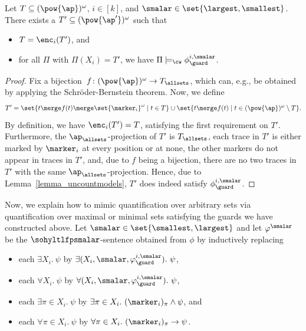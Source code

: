 \begin{lem}
\label{lemma_encodingrichness}
Let $T \subseteq (\pow{\ap})^\omega$, $i \in [k]$, and $\smalar \in \set{\largest,\smallest}$.
There exists a $T' \subseteq (\pow{\ap'})^\omega$ such that
\begin{itemize}
    \item $T = \enc_i(T')$, and 
    \item for all $\Pi$ with $\Pi(X_i) = T'$, we have $\Pi \models_\cw \phi_\guard^{i,\smalar}$.
\end{itemize}
\end{lem}

\begin{proof}
Fix a bijection~$f \colon (\pow{\ap})^\omega \rightarrow T_\allsets$, which can, e.g., be obtained by applying the Schröder-Bernstein theorem.
Now, we define 
\[T' = \set{t\merge f(t) \merge\set{\marker_{i}}^\omega \mid t \in T} \cup \set{t\merge f(t) \mid t \in (\pow{\ap})^\omega \setminus T}. \]
By definition, we have $\enc_i(T') = T$, satisfying the first requirement on $T'$.
Furthermore, the $\ap_\allsets$-projection of $T'$ is $T_\allsets$, each trace in $T'$ is either marked by $\marker_{i}$ at every position or at none, the other markers do not appear in traces in $T'$, and, due to $f$ being a bijection, there are no two traces in $T'$ with the same $\ap_\allsets$-projection.
Hence, due to Lemma~\ref{lemma_uncountmodels}, $T'$ does indeed satisfy $\phi_\guard^{i,\smalar}$.
\end{proof}

Now, we explain how to mimic quantification over arbitrary sets via quantification over maximal or minimal sets satisfying the guards we have constructed above.
Let $\smalar \in \set{\smallest, \largest}$ and let $\varphi^{\smalar}$ be the $\sohyltlfpsmalar$-sentence obtained from $\phi$ by inductively replacing 
\begin{itemize}
    \item each $\exists X_i.\ \psi$ by $\exists (X_i, \smalar, \varphi_\guard^{i,\smalar}).\ \psi$, 
    \item each $\forall X_i.\ \psi$ by $\forall (X_i, \smalar, \varphi_\guard^{i,\smalar}).\ \psi$, 
    \item each $\exists \pi \in X_i.\ \psi$ by $\exists \pi \in X_i.\ (\marker_{i})_{\pi} \wedge \psi$, and 
    \item each $\forall \pi \in X_i.\ \psi$ by $\forall \pi \in X_i.\ (\marker_{i})_{\pi} \rightarrow \psi$.
\end{itemize}

